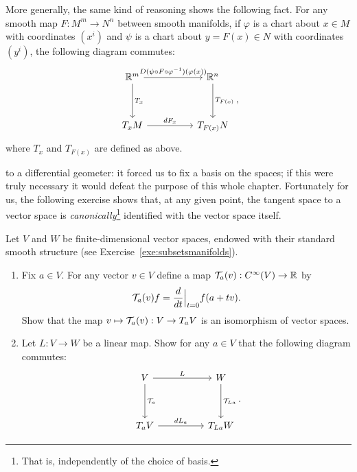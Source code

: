 More generally, the same kind of reasoning shows the following fact. For any smooth map $F:M^m \to N^n$ between smooth manifolds, if $\varphi$ is a chart about $x\in M$ with coordinates $(x^i)$ and $\psi$ is a chart about $y=F(x)\in N$ with coordinates $(y^i)$, the following diagram commutes:
\begin{equation}
	\begin{tikzcd}[row sep=huge, column sep=huge]
		\R^m \arrow[r, "D(\psi \circ F \circ \varphi^{-1})(\varphi(x))"] \arrow[d, "T_x"]
		& \R^n \arrow[d, "T_{F(x)}"] \\
		T_xM \arrow[r, "dF_x"]
		& T_{F(x)}N
	\end{tikzcd},
\end{equation}
where $T_x$ and $T_{F(x)}$ are defined as above.

 to a differential geometer: it forced us to fix a basis on the spaces; if this were truly necessary it would defeat the purpose of this whole chapter.
Fortunately for us, the following exercise shows that, at any given point, the tangent space to a vector space is \emph{canonically}\footnote{That is, independently of the choice of basis.} identified with the vector space itself.

\begin{exercise}\label{ex:tg_curve_iso}
	Let $V$ and $W$ be finite-dimensional vector spaces, endowed with their standard smooth structure (see Exercise~\ref{exe:subsetsmanifolds}).
	\begin{enumerate}
		\item Fix $a\in V$. For any vector $v\in V$ define a map $\mathcal{T}_a(v) : C^\infty(V) \to \mathbb{R}$ by
		      \begin{equation}
			      \mathcal{T}_a(v) f = \frac{d}{dt}\Big|_{t=0} f(a + tv).
		      \end{equation}
		      Show that the map $v\mapsto \mathcal{T}_a(v) : V \to T_aV$ is an isomorphism of vector spaces.
		\item Let $L:V\to W$ be a linear map. Show for any $a\in V$ that the following diagram commutes:
		      \begin{equation}
			      \begin{tikzcd}[row sep=huge, column sep=huge]
				      V \arrow[r, "L"] \arrow[d, "\cT_a"]
				      & W \arrow[d, "\cT_{La}"] \\
				      T_aV \arrow[r, "dL_a"]
				      & T_{La}W
			      \end{tikzcd}.
		      \end{equation}
	\end{enumerate}
\end{exercise}

